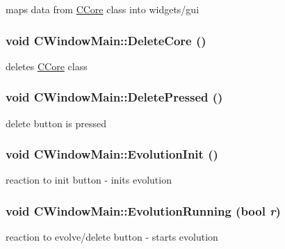 \label{classCWindowMain_a98613fbc73c34cbafce2990aa4585e0f}
maps data from \hyperlink{classCCore}{CCore} class into widgets/gui \hypertarget{classCWindowMain_a75d596613f67f6e7b1f363a3cef1c3a3}{
\subsubsection[{DeleteCore}]{\setlength{\rightskip}{0pt plus 5cm}void CWindowMain::DeleteCore ()}}
\label{classCWindowMain_a75d596613f67f6e7b1f363a3cef1c3a3}
deletes \hyperlink{classCCore}{CCore} class \hypertarget{classCWindowMain_a88e0119155757defdea0bdaf4ce84c55}{
\subsubsection[{DeletePressed}]{\setlength{\rightskip}{0pt plus 5cm}void CWindowMain::DeletePressed ()}}
\label{classCWindowMain_a88e0119155757defdea0bdaf4ce84c55}
delete button is pressed \hypertarget{classCWindowMain_a8622a7def9276f522c5c13eeb4491612}{
\subsubsection[{EvolutionInit}]{\setlength{\rightskip}{0pt plus 5cm}void CWindowMain::EvolutionInit ()}}
\label{classCWindowMain_a8622a7def9276f522c5c13eeb4491612}
reaction to init button -\/ inits evolution \hypertarget{classCWindowMain_a215d5fc27c694df1b869aa45b161d964}{
\subsubsection[{EvolutionRunning}]{\setlength{\rightskip}{0pt plus 5cm}void CWindowMain::EvolutionRunning (bool {\em r})}}
\label{classCWindowMain_a215d5fc27c694df1b869aa45b161d964}
reaction to evolve/delete button -\/ starts evolution


